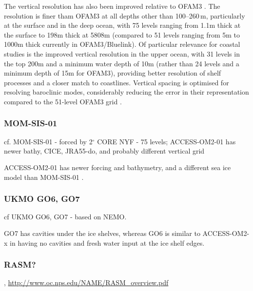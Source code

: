 \documentclass[11pt]{article}
\begin{document}
The vertical resolution has also been improved relative to OFAM3 \citep{OkeETAL2013a}. 
The resolution is finer tham OFAM3 at all depths other than 100--260\,m, particularly at the surface and in the deep ocean, with 75 levels ranging from 1.1m thick at the surface to 198m thick at 5808m (compared to 51 levels ranging from 5m to 1000m thick currently in OFAM3/Bluelink). 
Of particular relevance for coastal studies is the improved vertical resolution in the upper ocean, with 31 levels in the top 200m and a minimum water depth of 10m (rather than 24 levels and a minimum depth of 15m for OFAM3), providing better resolution of shelf processes and a closer match to coastlines. 
Vertical spacing is optimised for resolving baroclinic modes, considerably reducing the error in their representation compared to the 51-level OFAM3 grid \citep[][ table~1]{StewartHoggGriffiesHeerdegenWardSpenceEngland2017a}.

\citet{FengZhangOkeMonselesanChamberlainMatearSchiller2016a}

\subsubsection{MOM-SIS-01}
cf. MOM-SIS-01 \citet{SpenceHolmesHoggGriffiesStewartEngland2017a} - forced by 2$^\circ$ CORE NYF - 75 levels; ACCESS-OM2-01 has newer bathy, CICE, JRA55-do, and probably different vertical grid

ACCESS-OM2-01 has newer forcing and bathymetry, and a different sea ice model than MOM-SIS-01 \cite{SpenceHolmesHoggGriffiesStewartEngland2017a}.

\subsubsection{UKMO GO6, GO7}
cf UKMO GO6, GO7 \citet{StorkeyBlakerMathiotMegannAksenovBlockleyCalvertGrahamHewitt2018a} - based on NEMO.

GO7 has cavities under the ice shelves, whereas GO6 is similar to ACCESS-OM2-x in having no cavities and fresh water input at the ice shelf edges.

\subsubsection{RASM?}
\citet{CassanoDuVivierRobertsHughesSeefeldtBrunkeCraigFiselGutowski2017a,HammanNijssenRobertsCraigMaslowskiOsinski2017a,JinDealMaslowskiMatraiRobertsOsinskiLeeFrantsElliott2018a,Roberts2018a}, \url{http://www.oc.nps.edu/NAME/RASM_overview.pdf}
\end{document}
